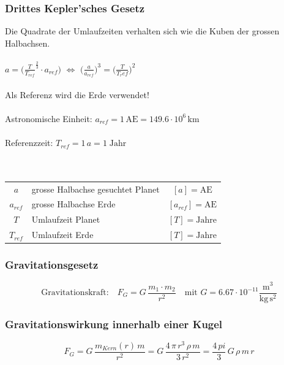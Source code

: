 	
	\vfill\null
	\columnbreak
	
	
	\subsubsection{Drittes Kepler'sches Gesetz}
	Die Quadrate der Umlaufzeiten verhalten sich wie die Kuben der grossen Halbachsen. \\
	\\
	$a = \big(  \frac{T}{T_{ref}}^{\frac{2}{3}} \cdot a_{ref} \big)$ \qquad $\Leftrightarrow$ \qquad $\big( \frac{a}{a_{ref}}  \big)^3 =  \big( \frac{T}{T_ref}  \big)^2 $ \\
	\\
	Als Referenz wird die Erde verwendet! \\
	\\
	Astronomische Einheit: $a_{ref} = 1 \, \mathrm{AE} = 149.6 \cdot 10^6 \, \mathrm{km}$ \\
	\\
	Referenzzeit: $T_{ref} = 1 \, a = 1 \; \mathrm{Jahr}$ \\
	\\
	\\
	\begin{tabular}{c l c}
	$a$ & grosse Halbachse gesuchtet Planet & $[a] = \mathrm{AE}$ \\
	$a_{ref}$ &  grosse Halbachse Erde & $[a_{ref}] = \mathrm{AE}$ \\	
	$T$ & Umlaufzeit Planet & $[T] = \mathrm{Jahre}$ \\
	$T_{ref}$ & Umlaufzeit Erde & $[T] = \mathrm{Jahre}$ \\
	\end{tabular}
	
	
	
	
	\subsubsection{Gravitationsgesetz}
	
	$$ \boxed{ \text{Gravitationskraft:}  \quad F_G = G \, \frac{m_1 \cdot m_2}{r^2} \quad \text{mit }G = 6.67 \cdot 10^{-11} \mathrm{\frac{m^3}{kg \, s^2}} }$$ 
	
	
	\subsubsection{Gravitationswirkung innerhalb einer Kugel}
	
	$$ \boxed{ F_G = G \, \frac{m_{Kern} (r) \, m}{r^2} =  G \, \frac{4 \, \pi \, r^3 \, \rho \, m}{3 \, r^2} = \frac{4 \, pi}{3} \, G \, \rho \, m \, r } $$ \\
	

